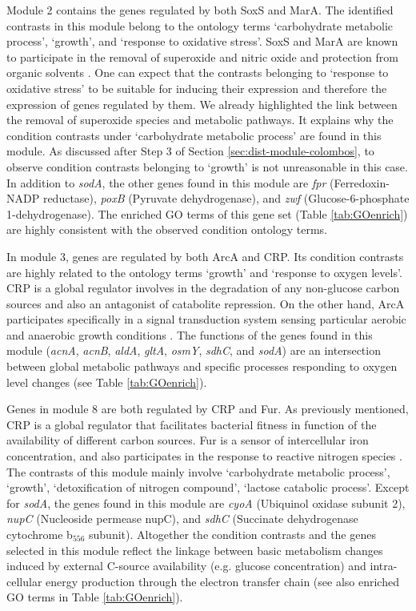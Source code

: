 Module 2 contains the genes regulated by both SoxS and MarA. The identified contrasts in this module belong to the ontology terms `carbohydrate metabolic process', `growth', and `response to oxidative stress'. SoxS and MarA are known to participate in the removal of superoxide and nitric oxide and protection from organic solvents \cite{Touati2000}.  One can expect that the contrasts belonging to `response to oxidative stress' to be suitable for inducing their expression and therefore the expression of genes regulated by them.  We already highlighted the link between the removal of superoxide species and metabolic pathways.  It explains why the condition contrasts under `carbohydrate metabolic process' are found in this module.   As discussed after Step 3 of Section \ref{sec:dist-module-colombos}, to observe condition contrasts belonging to `growth' is not unreasonable in this case.   In addition to \textit{sodA}, the other genes found in this module are \textit{fpr} (Ferredoxin-NADP reductase), \textit{poxB} (Pyruvate dehydrogenase), and \textit{zwf} (Glucose-6-phosphate 1-dehydrogenase). The enriched GO terms of this gene set (Table \ref{tab:GOenrich}) are highly consistent with the observed condition ontology terms.


In module 3, genes are regulated by both ArcA and CRP. Its condition contrasts are highly related to the ontology terms `growth' and `response to oxygen levels'.  CRP is a global regulator involves in the degradation of any non-glucose carbon sources and also an antagonist of catabolite repression.  On the other hand, ArcA participates specifically in a signal transduction system sensing particular aerobic and anaerobic growth conditions \cite{Compan1994}.   The functions of the genes found in this module (\textit{acnA}, \textit{acnB}, \textit{aldA}, \textit{gltA}, \textit{osmY}, \textit{sdhC}, and \textit{sodA}) are an intersection between global metabolic pathways and specific processes responding to oxygen level changes (see Table \ref{tab:GOenrich}).


Genes in module 8 are both regulated by CRP and Fur. As previously mentioned, CRP is a global regulator that facilitates bacterial fitness in function of the availability of different carbon sources.  Fur is a sensor of intercellular iron concentration, and also participates in the response to reactive nitrogen species \cite{Mukhopadhyay2004}.   The contrasts of this module mainly involve `carbohydrate metabolic process', `growth', `detoxification of nitrogen compound', `lactose catabolic process'.  Except for \textit{sodA}, the genes found in this module are \textit{cyoA} (Ubiquinol oxidase subunit 2), \textit{nupC} (Nucleoside permease nupC), and \textit{sdhC} (Succinate dehydrogenase cytochrome b$_{556}$ subunit). Altogether the condition contrasts and the genes selected in this module reflect the linkage between basic metabolism changes induced by external C-source availability (e.g. glucose concentration) and intra-cellular energy production through the electron transfer chain (see also enriched GO terms in Table \ref{tab:GOenrich}).


